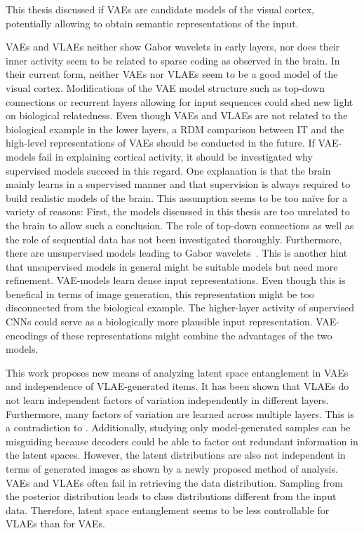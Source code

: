 This thesis discussed if \acfp{VAE} are candidate models of the visual cortex, potentially allowing to obtain semantic representations of the input.

\acp{VAE} and \acp{VLAE} neither show Gabor wavelets in early layers, nor does their inner activity seem to be related to sparse coding as observed in the brain.
In their current form, neither \acp{VAE} nor \acp{VLAE} seem to be a good model of the visual cortex.
Modifications of the \ac{VAE} model structure such as top-down connections or recurrent layers allowing for input sequences could shed new light on biological relatedness.
Even though \acp{VAE} and \acp{VLAE} are not related to the biological example in the lower layers, a \ac{RDM} comparison between \ac{IT} and the high-level representations of \acp{VAE} should be conducted in the future.
If \ac{VAE}-models fail in explaining cortical activity, it should be investigated why supervised models succeed in this regard.
One explanation is that the brain mainly learns in a supervised manner and that supervision is always required to build realistic models of the brain.
This assumption seems to be too naïve for a variety of reasons:
First, the models discussed in this thesis are too unrelated to the brain to allow such a conclusion.
The role of top-down connections as well as the role of sequential data has not been investigated thoroughly.
Furthermore, there are unsupervised models leading to Gabor wavelets~\citep{Olshausen1996,berkes2005slow}.
This is another hint that unsupervised models in general might be suitable models but need more refinement.
\ac{VAE}-models learn dense input representations.
Even though this is benefical in terms of image generation, this representation might be too disconnected from the biological example.
The higher-layer activity of supervised \acp{CNN} could serve as a biologically more plausible input representation.
\ac{VAE}-encodings of these representations might combine the advantages of the two models.

This work proposes new means of analyzing latent space entanglement in \acp{VAE} and independence of \ac{VLAE}-generated items.
It has been shown that \acp{VLAE} do not learn independent factors of variation independently in different layers.
Furthermore, many factors of variation are learned across multiple layers.
This is a contradiction to \citet{zhao2017learning}.
Additionally, studying only model-generated samples can be misguiding because decoders could be able to factor out redundant information in the latent spaces.
However, the latent distributions are also not independent in terms of generated images as shown by a newly proposed method of analysis.
\acp{VAE} and \acp{VLAE} often fail in retrieving the data distribution.
Sampling from the posterior distribution leads to class distributions different from the input data.
Therefore, latent space entanglement seems to be less controllable for \acp{VLAE} than for \acp{VAE}.

